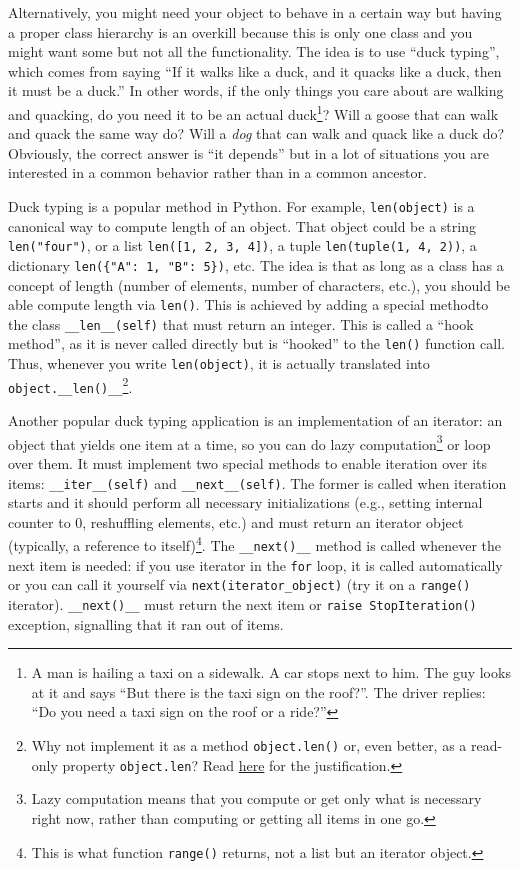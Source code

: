 \documentclass[
]{book}
\begin{document}
Alternatively, you might need your object to behave in a certain way but having a proper class hierarchy is an overkill because this is only one class and you might want some but not all the functionality. The idea is to use ``duck typing'', which comes from saying ``If it walks like a duck, and it quacks like a duck, then it must be a duck.'' In other words, if the only things you care about are walking and quacking, do you need it to be an actual duck\footnote{A man is hailing a taxi on a sidewalk. A car stops next to him. The guy looks at it and says ``But there is the taxi sign on the roof?''. The driver replies: ``Do you need a taxi sign on the roof or a ride?''}? Will a goose that can walk and quack the same way do? Will a \emph{dog} that can walk and quack like a duck do? Obviously, the correct answer is ``it depends'' but in a lot of situations you are interested in a common behavior rather than in a common ancestor.

Duck typing is a popular method in Python. For example, \texttt{len(object)} is a canonical way to compute length of an object. That object could be a string \texttt{len("four")}, or a list \texttt{len({[}1,\ 2,\ 3,\ 4{]})}, a tuple \texttt{len(tuple(1,\ 4,\ 2))}, a dictionary \texttt{len(\{"A":\ 1,\ "B":\ 5\})}, etc. The idea is that as long as a class has a concept of length (number of elements, number of characters, etc.), you should be able compute length via \texttt{len()}. This is achieved by adding a special methodto the class \texttt{\_\_len\_\_(self)} that must return an integer. This is called a ``hook method'', as it is never called directly but is ``hooked'' to the \texttt{len()} function call. Thus, whenever you write \texttt{len(object)}, it is actually translated into \texttt{object.\_\_len()\_\_}\footnote{Why not implement it as a method \texttt{object.len()} or, even better, as a read-only property \texttt{object.len}? Read \href{https://mail.python.org/pipermail/python-3000/2006-November/004643.html}{here} for the justification.}.

Another popular duck typing application is an implementation of an iterator: an object that yields one item at a time, so you can do lazy computation\footnote{Lazy computation means that you compute or get only what is necessary right now, rather than computing or getting all items in one go.} or loop over them. It must implement two special methods to enable iteration over its items: \texttt{\_\_iter\_\_(self)} and \texttt{\_\_next\_\_(self)}. The former is called when iteration starts and it should perform all necessary initializations (e.g., setting internal counter to 0, reshuffling elements, etc.) and must return an iterator object (typically, a reference to itself)\footnote{This is what function \texttt{range()} returns, not a list but an iterator object.}. The \texttt{\_\_next()\_\_} method is called whenever the next item is needed: if you use iterator in the \texttt{for} loop, it is called automatically or you can call it yourself via \texttt{next(iterator\_object)} (try it on a \texttt{range()} iterator). \texttt{\_\_next()\_\_} must return the next item or \texttt{raise\ StopIteration()} exception, signalling that it ran out of items.
\end{document}
